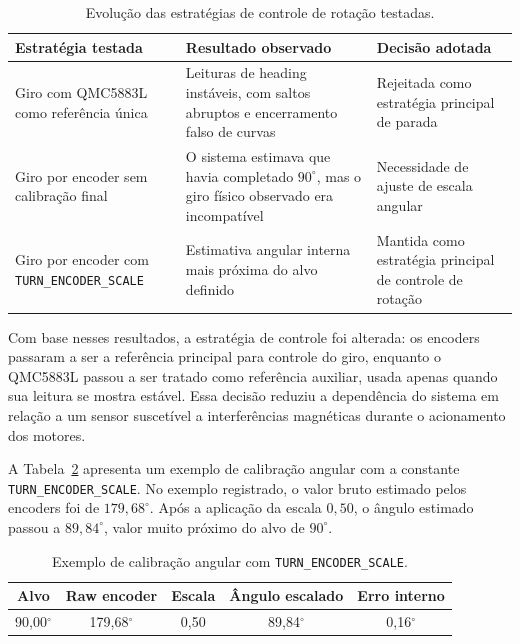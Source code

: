 \documentclass[	12pt, Times, openright, twoside, a4paper, english, brazil]{abntex2}
\begin{document}
\begin{table}[H]
	\centering
	\caption{Evolução das estratégias de controle de rotação testadas.}
	\label{tab:rotacao-comparacao}
	\begin{tabular}{p{3.5cm} p{4.2cm} p{5.3cm}}
		\hline
		\textbf{Estratégia testada} & \textbf{Resultado observado} & \textbf{Decisão adotada} \\
		\hline
		Giro com QMC5883L como referência única & Leituras de heading instáveis, com saltos abruptos e encerramento falso de curvas & Rejeitada como estratégia principal de parada \\
		Giro por encoder sem calibração final & O sistema estimava que havia completado \(90^\circ\), mas o giro físico observado era incompatível & Necessidade de ajuste de escala angular \\
		Giro por encoder com \texttt{TURN\_\allowbreak ENCODER\_\allowbreak SCALE} & Estimativa angular interna mais próxima do alvo definido & Mantida como estratégia principal de controle de rotação \\
		\hline
	\end{tabular}
\end{table}

Com base nesses resultados, a estratégia de controle foi alterada: os encoders passaram a ser a referência principal para controle do giro, enquanto o QMC5883L passou a ser tratado como referência auxiliar, usada apenas quando sua leitura se mostra estável. Essa decisão reduziu a dependência do sistema em relação a um sensor suscetível a interferências magnéticas durante o acionamento dos motores.

A Tabela~\ref{tab:turn-encoder-scale} apresenta um exemplo de calibração angular com a constante \texttt{TURN\_ENCODER\_SCALE}. No exemplo registrado, o valor bruto estimado pelos encoders foi de \(179{,}68^\circ\). Após a aplicação da escala \(0{,}50\), o ângulo estimado passou a \(89{,}84^\circ\), valor muito próximo do alvo de \(90^\circ\).

\begin{table}[H]
	\centering
	\caption{Exemplo de calibração angular com \texttt{TURN\_ENCODER\_SCALE}.}
	\label{tab:turn-encoder-scale}
	\begin{tabular}{c c c c c}
		\hline
		\textbf{Alvo} & \textbf{Raw encoder} & \textbf{Escala} & \textbf{Ângulo escalado} & \textbf{Erro interno} \\
		\hline
		90,00$^\circ$ & 179,68$^\circ$ & 0,50 & 89,84$^\circ$ & 0,16$^\circ$ \\
		\hline
	\end{tabular}
\end{table}
\end{document}
